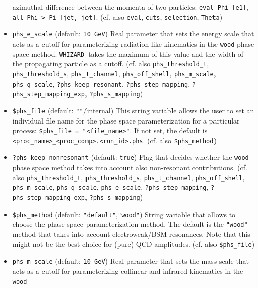 \documentclass[12pt]{book}
\newcommand{\ttt}[1]{\texttt{#1}}
\newcommand{\whizard}{\texttt{WHIZARD}}
\begin{document}
\begin{itemize}
azimuthal difference between the momenta of two particles: \ttt{eval
Phi [e1]},  \ttt{all Phi > Pi [jet, jet]}. (cf. also \ttt{eval},
\ttt{cuts}, \ttt{selection}, \ttt{Theta}) 
\item
\ttt{phs\_e\_scale} \qquad (default: \ttt{10 GeV}) \newline
Real parameter that sets the energy scale that acts as a cutoff for
parameterizing radiation-like kinematics in the \ttt{wood} phase space
method. \whizard\ takes the maximum of this value and the width of the
propagating particle as a cutoff. (cf. also \ttt{phs\_threshold\_t},
\ttt{phs\_threshold\_s}, \ttt{phs\_t\_channel}, \ttt{phs\_off\_shell}, 
\ttt{phs\_m\_scale}, \ttt{phs\_q\_scale},
\newline \ttt{?phs\_keep\_resonant}, \ttt{?phs\_step\_mapping},
\ttt{?phs\_step\_mapping\_exp}, 
\ttt{?phs\_s\_mapping}) 
\item
\ttt{\$phs\_file} \qquad (default: \ttt{""}/internal) \newline
This string variable allows the user to set an individual file name
for the phase space parameterization for a particular process:
\ttt{\$phs\_file = "<file\_name>"}. If not set, the default is 
\ttt{<proc\_name>\_<proc\_comp>.<run\_id>.phs}. (cf. also
\ttt{\$phs\_method})
\item
\ttt{?phs\_keep\_nonresonant} \qquad (default: \ttt{true}) \newline 
Flag that decides whether the \ttt{wood} phase space method takes into
account also non-resonant contributions.  (cf. also \ttt{phs\_threshold\_t},
\ttt{phs\_threshold\_s}, \ttt{phs\_t\_channel}, \ttt{phs\_off\_shell}, 
\ttt{phs\_m\_scale}, \ttt{phs\_q\_scale},
\ttt{phs\_e\_scale}, \ttt{?phs\_step\_mapping},
\newline \ttt{?phs\_step\_mapping\_exp}, 
\ttt{?phs\_s\_mapping}) 
\item
\ttt{\$phs\_method} \qquad (default: \ttt{"default"},\ttt{"wood"})
\newline 
String variable that allows to choose the phase-space parameterization
method. The default is the \ttt{"wood"} method that takes into account
electroweak/BSM resonances. Note that this might not be the best
choice for (pure) QCD amplitudes. (cf. also \ttt{\$phs\_file})
\item
\ttt{phs\_m\_scale} \qquad (default: \ttt{10 GeV}) \newline
Real parameter that sets the mass scale that acts as a cutoff for
parameterizing collinear and infrared kinematics in the \ttt{wood}

\end{itemize}
\end{document}
